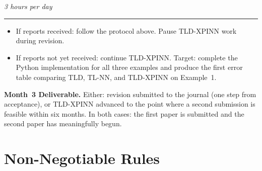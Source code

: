 \documentclass[12pt,a4paper]{article}
\newcommand{\dayheading}[2]{%
  \vspace{0.3em}
  \noindent{\bfseries\color{darkblue}Day~#1}%
  \hfill{\small\color{darkgray}\textit{#2}}%
  \\[-0.4em]{\color{midgray}\rule{\linewidth}{0.4pt}}%
  \vspace{0.1em}
}
\begin{document}
\begin{tcolorbox}[daystyle]
\dayheading{71--84}{3 hours per day}
\begin{itemize}[leftmargin=1.8em,itemsep=3pt]
  \item[\color{midblue}$\bullet$]
    If reports received: follow the protocol above.
    Pause TLD-XPINN work during revision.
  \item[\color{midblue}$\bullet$]
    If reports not yet received: continue TLD-XPINN.
    Target: complete the Python implementation for all
    three examples and produce the first error table
    comparing TLD, TL-NN, and TLD-XPINN on Example~1.
\end{itemize}
\end{tcolorbox}

\begin{tcolorbox}[deliverablestyle]
\noindent\textbf{\color{darkgreen}Month~3 Deliverable.}
Either: revision submitted to the journal (one step from
acceptance), or TLD-XPINN advanced to the point where a
second submission is feasible within six months.
In both cases: the first paper is submitted and the second
paper has meaningfully begun.
\end{tcolorbox}

\newpage
\section{Non-Negotiable Rules}
\end{document}
